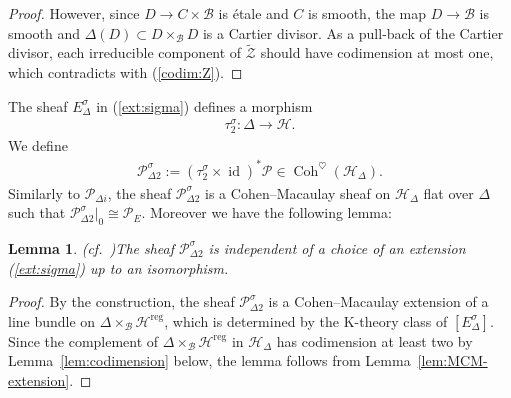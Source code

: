 \documentclass[11pt,oneside,a4paper,mathscr]{amsart}
\newtheorem{lemma}[thm]{Lemma}
\theoremstyle{definition}
\newcommand{\cH}{\mathcal{H}}
\newcommand{\cB}{\mathcal{B}}
\newcommand{\cP}{\mathcal{P}}
\newcommand{\Coh}{\operatorname{Coh}}
\newcommand{\id}{\operatorname{id}}
\begin{document}
\begin{proof}
However, since $D \to C\times \cB$ is \'etale and $C$ is smooth, 
the map $D \to \cB$ is smooth and 
$\Delta(D) \subset D\times_{\cB}D$ is a Cartier divisor. 
As a pull-back of the Cartier divisor, each irreducible component of 
$\widetilde{\mathcal{Z}}$ should have codimension at most one, which 
contradicts with (\ref{codim:Z}). 
\end{proof}

The sheaf $E_{\Delta}^{\sigma}$ in (\ref{ext:sigma}) defines a morphism 
\begin{align}\label{def:tausig}
    \tau_2^{\sigma} \colon \Delta \to \mathcal{H}. 
\end{align}
We define 
\begin{align*}
    \cP_{\Delta 2}^{\sigma}:=(\tau_2^{\sigma}\times \id)^* \cP\in \Coh^{\heartsuit}(\cH_{\Delta}).
\end{align*}
Similarly to $\mathcal{P}_{\Delta i}$, the sheaf $\mathcal{P}_{\Delta 2}^{\sigma}$ is a Cohen--Macaulay sheaf on 
$\mathcal{H}_{\Delta}$ flat over $\Delta$ such that $\mathcal{P}_{\Delta 2}^{\sigma}|_{0} \cong \mathcal{P}_E$. 
Moreover we have the following lemma: 
\begin{lemma}\emph{(cf.~\cite[Lemma~5.6]{TodaGL2})}\label{lem:inde}
The sheaf $\cP_{\Delta 2}^{\sigma}$ is 
independent of a choice of an extension (\ref{ext:sigma}) up to an isomorphism. 
\end{lemma}
\begin{proof}
By the construction, 
the sheaf $\mathcal{P}_{\Delta 2}^{\sigma}$ is a Cohen--Macaulay extension of a line bundle on 
$\Delta \times_{\cB} \mathcal{H}^{\mathrm{reg}}$, which is determined by the K-theory class of 
$[E_{\Delta}^{\sigma}]$. 
Since the complement of $\Delta \times_{\cB} \mathcal{H}^{\mathrm{reg}}$ in $\mathcal{H}_{\Delta}$ has 
codimension at least two by Lemma~\ref{lem:codimension} below, the lemma follows from Lemma~\ref{lem:MCM-extension}. 
\end{proof}
\end{document}
